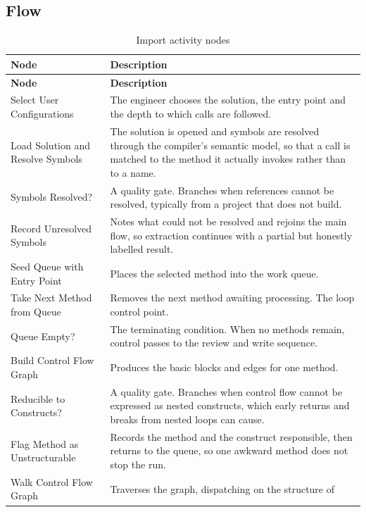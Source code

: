 \subsection{Flow}

\begin{longtable}{L{0.30\textwidth}L{0.62\textwidth}}
	\caption{Import activity nodes}\label{tab:import-nodes}\\
	\toprule
	\textbf{Node} & \textbf{Description} \\
	\midrule
	\endfirsthead
	\toprule
	\textbf{Node} & \textbf{Description} \\
	\midrule
	\endhead

	Select User Configurations & The engineer chooses the solution, the entry
	point and the depth to which calls are followed. \\
	\addlinespace
	Load Solution and Resolve Symbols & The solution is opened and symbols are
	resolved through the compiler's semantic model, so that a call is matched to
	the method it actually invokes rather than to a name. \\
	\addlinespace
	Symbols Resolved? & A quality gate. Branches when references cannot be
	resolved, typically from a project that does not build. \\
	\addlinespace
	Record Unresolved Symbols & Notes what could not be resolved and rejoins the
	main flow, so extraction continues with a partial but honestly labelled
	result. \\
	\addlinespace
	Seed Queue with Entry Point & Places the selected method into the work
	queue. \\
	\addlinespace
	Take Next Method from Queue & Removes the next method awaiting processing. The
	loop control point. \\
	\addlinespace
	Queue Empty? & The terminating condition. When no methods remain, control
	passes to the review and write sequence. \\
	\addlinespace
	Build Control Flow Graph & Produces the basic blocks and edges for one
	method. \\
	\addlinespace
	Reducible to Constructs? & A quality gate. Branches when control flow cannot
	be expressed as nested constructs, which early returns and breaks from nested
	loops can cause. \\
	\addlinespace
	Flag Method as Unstructurable & Records the method and the construct
	responsible, then returns to the queue, so one awkward method does not stop the
	run. \\
	\addlinespace
	Walk Control Flow Graph & Traverses the graph, dispatching on the structure of

\end{longtable}
